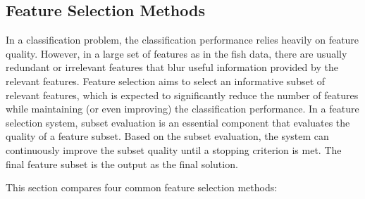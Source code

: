 \documentclass[runningheads]{llncs}
\begin{document}
\subsection{Feature Selection Methods}

In a classification problem, the classification performance relies heavily on feature quality. 
However, in a large set of features as in the fish data, there are usually redundant or irrelevant features that blur useful information provided by the relevant features. 
Feature selection aims to select an informative subset of relevant features, which is expected to significantly reduce the number of features while maintaining (or even improving) the classification performance.
In a feature selection system, subset evaluation is an essential component that evaluates the quality of a feature subset. 
Based on the subset evaluation, the system can continuously improve the subset quality until a stopping criterion is met. 
The final feature subset is the output as the final solution. 

This section compares four common feature selection methods: 
\end{document}
